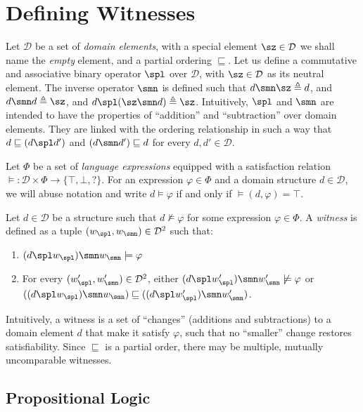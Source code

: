 

\section{Defining Witnesses} %

Let $\mathcal{D}$ be a set of \emph{domain elements}, with a special element $\sz \in \mathcal{D}$ we shall name the \emph{empty} element, and a partial ordering $\sqsubseteq$. Let us define a commutative and associative binary operator $\spl$ over $\mathcal{D}$, with $\sz \in \mathcal{D}$ as its neutral element. The inverse operator $\smn$ is defined such that $d \smn \sz \triangleq d$, and $d \smn d \triangleq \sz$, and $d \spl (\sz \smn d) \triangleq \sz$. Intuitively, $\spl$ and $\smn$ are intended to have the properties of ``addition'' and ``subtraction'' over domain elements. They are linked with the ordering relationship in such a way that $d \sqsubseteq (d \spl d')$ and $(d \smn d') \sqsubseteq d$ for every $d, d' \in \mathcal{D}$.

Let $\Phi$ be a set of \emph{language expressions} equipped with a satisfaction relation $\models : \mathcal{D} \times \Phi \rightarrow \{\top,\bot,?\}$. For an expression $\varphi \in \Phi$ and a domain structure $d \in \mathcal{D}$, we will abuse notation and write $d \models \varphi$ if and only if $\models(d,\varphi) = \top$.

Let $d \in \mathcal{D}$ be a structure such that $d \not\models \varphi$ for some expression $\varphi \in \Phi$. A \emph{witness} is defined as a tuple $(w_\spl,w_\smn) \in \mathcal{D}^2$ such that:
%
\begin{enumerate}
\item $(d \spl w_\spl) \smn w_\smn \models \varphi$
\item For every $(w'_\spl,w'_\smn) \in \mathcal{D}^2$, either $(d \spl w'_\spl) \smn w'_\smn \not\models \varphi$ or $((d \spl w_\spl) \smn w_\smn) \sqsubseteq ((d \spl w'_\spl) \smn w'_\smn)$.
\end{enumerate}

Intuitively, a witness is a set of ``changes'' (additions and subtractions) to a domain element $d$ that make it satisfy $\varphi$, such that no ``smaller'' change restores satisfiability. Since $\sqsubseteq$ is a partial order, there may be multiple, mutually uncomparable witnesses.

\subsection{Propositional Logic}

